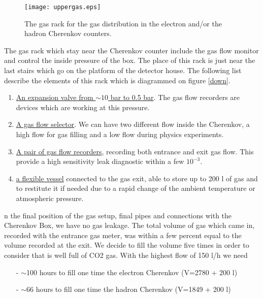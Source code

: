 \documentclass[12pt]{article}
\begin{document}

\begin{figure}
\begin{center}
\texttt{[image: uppergas.eps]}
{\linespread{1.}
\caption[Cherenkov gas flow]{The gas rack for the gas distribution in the electron and/or
the hadron Cherenkov counters.}
\label{fen}}
\end{center}
\end{figure}

The gas rack which stay near the Cherenkov counter include the gas flow
 monitor and control the inside pressure of the box. The place of this rack is
just near the last stairs which go on the platform of the detector house. The
following list describe the elements of this rack which is diagrammed on
 figure \ref{down}.
\begin{enumerate}
\item \underline{An expansion valve from $\sim 10$ bar to 0.5 bar}. The
 gas flow recorders are devices which are working at this pressure.
\item \underline{A gas flow selector}. We can have two different flow
 inside the Cherenkov, a high flow for gas filling and a low flow 
during physics experiments. 
\item \underline{A pair of gas flow recorders}, recording both entrance 
and exit gas flow.
This provide a high sensitivity leak diagnostic within a few $10^{-3}$.
\item \underline{a flexible vessel} connected to the gas exit, able to 
store up to 200 l of gas and to restitute it if needed due to a rapid change 
of the ambient temperature or atmospheric pressure.
\end{enumerate}


n the final position of the gas setup, final pipes and connections with the
 Cherenkov Box, we have no gas leakage. The total volume of gas which came in, 
recorded with the entrance gas meter, was within a few percent equal to the
volume recorded at the exit.
We decide to fill the volume five times 
in order to consider that is well full of CO2 gas. 
With the highest flow of 150 l/h we need 
\begin{itemize}
\item[-] $\sim$100 hours to fill one time the electron Cherenkov
 (V=2780 + 200 l)
\item[-] $\sim$66 hours to fill one time the hadron Cherenkov 
(V=1849 + 200 l)
\end{itemize}
\end{document}
